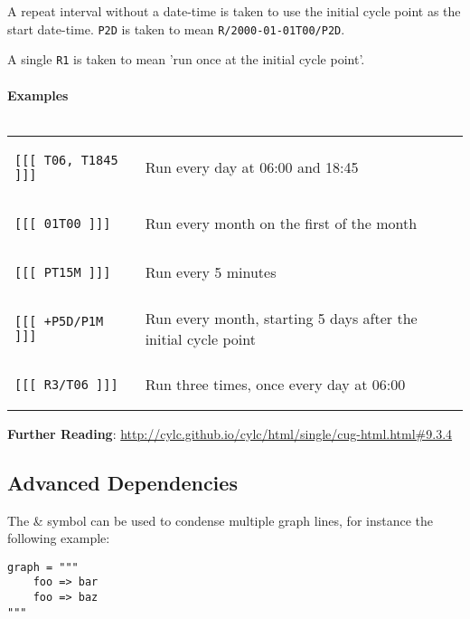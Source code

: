 A repeat interval without a date-time is taken to use the initial cycle point as the start date-time. \lstinline{P2D} is taken to mean \lstinline{R/2000-01-01T00/P2D}.

A single \lstinline{R1} is taken to mean 'run once at the initial cycle point'.

\paragraph*{Examples} $ $

\begin{tabular}{l l}
\begin{lstlisting}
[[[ T06, T1845 ]]]
\end{lstlisting}
& Run every day at 06:00 and 18:45\\
\begin{lstlisting}
[[[ 01T00 ]]]
\end{lstlisting}
& Run every month on the first of the month \\
\begin{lstlisting}
[[[ PT15M ]]]
\end{lstlisting}
& Run every 5 minutes \\
\begin{lstlisting}
[[[ +P5D/P1M ]]]
\end{lstlisting}
& Run every month, starting 5 days after the initial cycle point \\
\begin{lstlisting}
[[[ R3/T06 ]]]
\end{lstlisting}
& Run three times, once every day at 06:00
\\
\end{tabular}

\begin{shaded*}
\textbf{Further Reading}:
\url{http://cylc.github.io/cylc/html/single/cug-html.html#9.3.4}
\end{shaded*}


\subsection{Advanced Dependencies}

The \& symbol can be used to condense multiple graph lines, for instance the
following example:

\begin{lstlisting}
graph = """
    foo => bar
    foo => baz
"""
\end{lstlisting}

